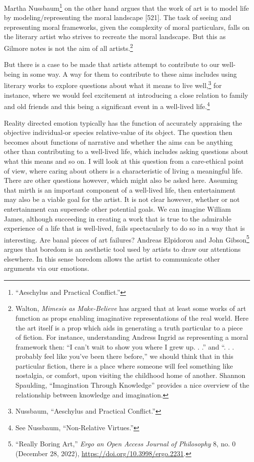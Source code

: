 \documentclass[phdthesis,12pt,final]{wuthesis}
\theoremstyle{definition}
\theoremstyle{definition}
\theoremstyle{definition}
\theoremstyle{definition}
\theoremstyle{remark}
\begin{document}
Martha Nussbaum\footnote{{``Aeschylus and Practical Conflict.''}} on the other hand argues that the work of art is to model life by modeling/representing the moral landscape {[}521{]}. The task of seeing and representing moral frameworks, given the complexity of moral particulars, falls on the literary artist who strives to recreate the moral landscape. But this as Gilmore notes is not the aim of all artists.\footnote{Walton, \emph{Mimesis as {Make-Believe}} has argued that at least some works of art function as props enabling imaginative representations of the real world. Here the art itself is a prop which aids in generating a truth particular to a piece of fiction. For instance, understanding Andress Ingrid as representing a moral framework then: ``I can't wait to show you where I grew up. . .'' and ``. . . probably feel like you've been there before,'' we should think that in this particular fiction, there is a place where someone will feel something like nostalgia, or comfort, upon visiting the childhood home of another. Shannon Spaulding, {``Imagination {Through Knowledge}''} provides a nice overview of the relationship between knowledge and imagination.}

But there is a case to be made that artists attempt to contribute to our well-being in some way. A way for them to contribute to these aims includes using literary works to explore questions about what it means to live well,\footnote{Nussbaum, {``Aeschylus and Practical Conflict.''}} for instance, where we would feel excitement at introducing a close relation to family and old friends and this being a significant event in a well-lived life.\footnote{See Nussbaum, {``Non-Relative Virtues.''}}

Reality directed emotion typically has the function of accurately appraising the objective individual-or species relative-value of its object. The question then becomes about functions of narrative and whether the aims can be anything other than contributing to a well-lived life, which includes asking questions about what this means and so on. I will look at this question from a care-ethical point of view, where caring about others is a characteristic of living a meaningful life. There are other questions however, which might also be asked here. Assuming that mirth is an important component of a well-lived life, then entertainment may also be a viable goal for the artist. It is not clear however, whether or not entertainment can supersede other potential goals. We can imagine William James, although succeeding in creating a work that is true to the admirable experience of a life that is well-lived, fails spectacularly to do so in a way that is interesting. Are banal pieces of art failures? Andreas Elpidorou and John Gibson\footnote{{``Really {Boring Art},''} \emph{Ergo an Open Access Journal of Philosophy} 8, no. 0 (December 28, 2022), \url{https://doi.org/10.3998/ergo.2231}.} argues that boredom is an aesthetic tool used by artists to draw our attentions elsewhere. In this sense boredom allows the artist to communicate other arguments via our emotions.
\end{document}
